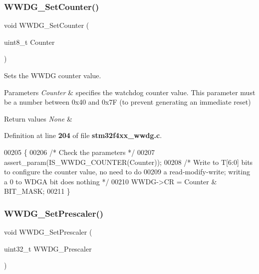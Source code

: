 \subsubsection{W\+W\+D\+G\+\_\+\+Set\+Counter()}
{\footnotesize\ttfamily void W\+W\+D\+G\+\_\+\+Set\+Counter (\begin{DoxyParamCaption}\item[{uint8\+\_\+t}]{Counter }\end{DoxyParamCaption})}



Sets the W\+W\+DG counter value. 


\begin{DoxyParams}{Parameters}
{\em Counter} & specifies the watchdog counter value. This parameter must be a number between 0x40 and 0x7F (to prevent generating an immediate reset) \\
\hline
\end{DoxyParams}

\begin{DoxyRetVals}{Return values}
{\em None} & \\
\hline
\end{DoxyRetVals}


Definition at line \textbf{ 204} of file \textbf{ stm32f4xx\+\_\+wwdg.\+c}.


\begin{DoxyCode}
00205 \{
00206   \textcolor{comment}{/* Check the parameters */}
00207   assert_param(IS_WWDG_COUNTER(Counter));
00208   \textcolor{comment}{/* Write to T[6:0] bits to configure the counter value, no need to do}
00209 \textcolor{comment}{     a read-modify-write; writing a 0 to WDGA bit does nothing */}
00210   WWDG->CR = Counter & BIT_MASK;
00211 \}
\end{DoxyCode}
\mbox{\label{group__WWDG__Group1_gafeaa2b52c31ba7baca7eb61d2d42e07b}} 
\subsubsection{W\+W\+D\+G\+\_\+\+Set\+Prescaler()}
{\footnotesize\ttfamily void W\+W\+D\+G\+\_\+\+Set\+Prescaler (\begin{DoxyParamCaption}\item[{uint32\+\_\+t}]{W\+W\+D\+G\+\_\+\+Prescaler }\end{DoxyParamCaption})}



